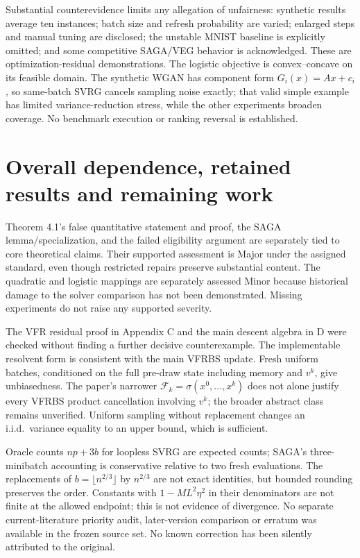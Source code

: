 \documentclass[10pt]{article}
\begin{document}
Substantial counterevidence limits any allegation of unfairness: synthetic results average ten instances; batch size and refresh probability are varied; enlarged steps and manual tuning are disclosed; the unstable MNIST baseline is explicitly omitted; and some competitive SAGA/VEG behavior is acknowledged. These are optimization-residual demonstrations. The logistic objective is convex–concave on its feasible domain. The synthetic WGAN has component form \(G_i(x)=Ax+c_i\), so same-batch SVRG cancels sampling noise exactly; that valid simple example has limited variance-reduction stress, while the other experiments broaden coverage. No benchmark execution or ranking reversal is established.\par
\section*{Overall dependence, retained results and remaining work}
Theorem 4.1’s false quantitative statement and proof, the SAGA lemma/specialization, and the failed eligibility argument are separately tied to core theoretical claims. Their supported assessment is Major under the assigned standard, even though restricted repairs preserve substantial content. The quadratic and logistic mappings are separately assessed Minor because historical damage to the solver comparison has not been demonstrated. Missing experiments do not raise any supported severity.\par
The VFR residual proof in Appendix C and the main descent algebra in D were checked without finding a further decisive counterexample. The implementable resolvent form is consistent with the main VFRBS update. Fresh uniform batches, conditioned on the full pre-draw state including memory and \(v^k\), give unbiasedness. The paper’s narrower \(\mathcal F_k=\sigma(x^0,\ldots,x^k)\) does not alone justify every VFRBS product cancellation involving \(v^k\); the broader abstract class remains unverified. Uniform sampling without replacement changes an i.i.d. variance equality to an upper bound, which is sufficient.\par
Oracle counts \(np+3b\) for loopless SVRG are expected counts; SAGA’s three-minibatch accounting is conservative relative to two fresh evaluations. The replacements of \(b=\lfloor n^{2/3}\rfloor\) by \(n^{2/3}\) are not exact identities, but bounded rounding preserves the order. Constants with \(1-ML^2\eta^2\) in their denominators are not finite at the allowed endpoint; this is not evidence of divergence. No separate current-literature priority audit, later-version comparison or erratum was available in the frozen source set. No known correction has been silently attributed to the original.\par
\end{document}
